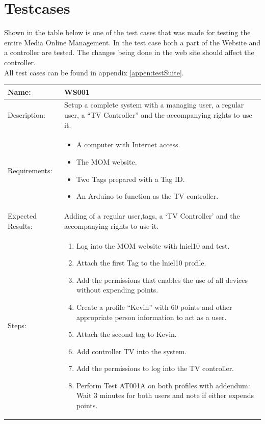 \section{Testcases}
\label{sec:testcase}
Shown in the table below is one of the test cases that was made for testing the entire Media Online Management. In the test case both a part of the Website and a controller are tested. The changes being done in the web site should affect the controller.\\ 
 All test cases can be found in appendix \vref{appen:testSuite}.
\begin{table}[h]
	\centering
		\begin{tabular}{|l|p{9cm}|}
		\hline
		\hline
		Name: & WS001\\
		\hline
		Description: & Setup a complete system with a managing user, a regular user, a ``TV Controller'' and the accompanying rights to use it.\\
		\hline
		Requirements: & 
		\begin{itemize}
			\item A computer with Internet access.
			\item The MOM website.
			\item Two Tags prepared with a Tag ID.
			\item An Arduino to function as the TV controller. 
		\end{itemize}
		\\
		\hline
		Expected Results: & Adding of a regular user,tags, a `TV Controller' and the accompanying rights to use it.\\
		\hline
		Steps: & 
		\begin{enumerate}
			\item Log into the MOM website with lniel10 and test.
			\item Attach the first Tag to the lniel10 profile.
			\item Add the permissions that enables the use of all devices without expending points.
			\item Create a profile ``Kevin'' with 60 points and other appropriate person information to act as a user.
			\item Attach the second tag to Kevin.
			\item Add controller TV into the system.
			\item Add the permissions to log into the TV controller.
			\item Perform Test AT001A on both profiles with addendum: Wait 3 minutes for both users and note if either expends points.
		\end{enumerate}
		\\		
		\hline
		\end{tabular}
\end{table}


